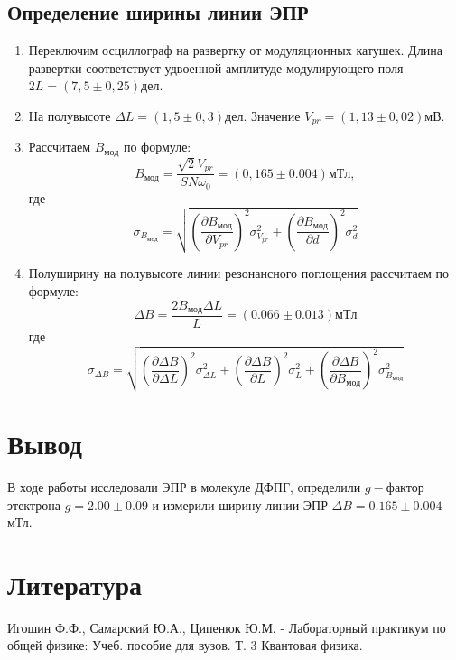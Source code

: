 \documentclass[a4paper]{article}
\begin{document}
\subsection{Определение ширины линии ЭПР}
\begin{enumerate} 
    \item Переключим осциллограф на развертку от модуляционных катушек. Длина развертки соответствует удвоенной амплитуде модулирующего поля $2L = (7,5 \pm 0,25) дел$.
    \item На полувысоте $\varDelta L = (1,5 \pm 0,3) дел$. Значение $V_{pr} = (1,13 \pm 0,02)$мВ.
    \item Рассчитаем $B_{мод}$ по формуле:
    \begin{equation}
        B_{мод} = \frac{\sqrt{2}V_{pr}}{SN\omega_0} = (0,165 \pm 0.004 )мТл\label{eq14}, 
    \end{equation}
    где 
    \begin{equation}
        \sigma_{B_{мод}} = \sqrt{(\frac{\partial B_{мод}}{\partial V_{pr}})^2\sigma_{V_{pr}}^2+(\frac{\partial B_{мод}}{\partial d})^2\sigma_{d}^2}  \label{eq13}
    \end{equation}
    \item Полуширину на полувысоте линии резонансного поглощения рассчитаем по формуле:
        \begin{equation}
           \varDelta B = \frac{2 B_{мод}\varDelta L}{L} = (0.066 \pm 0.013) мТл 
        \end{equation}
        где 
        \begin{equation}
            \sigma_{ \varDelta B} = \sqrt{(\frac{\partial \varDelta B}{\partial \varDelta L})^2\sigma_{\varDelta L}^2+(\frac{\partial \varDelta B}{\partial L})^2\sigma_{L}^2+(\frac{\partial \varDelta B}{\partial B_{мод}})^2\sigma^2_{B_{мод}}}  \label{eq13}
        \end{equation}
\end{enumerate}

\section{Вывод}
 В ходе работы исследовали ЭПР в молекуле ДФПГ, определили $g-$фактор этектрона $g = 2.00 \pm 0.09$ и измерили ширину линии ЭПР $\varDelta B = 0.165 \pm 0.004$ мТл.

\section{Литература}
Игошин Ф.Ф., Самарский Ю.А., Ципенюк Ю.М.  - Лабораторный практикум по общей физике: Учеб. пособие для вузов. Т. 3 Квантовая физика. 
\end{document}
